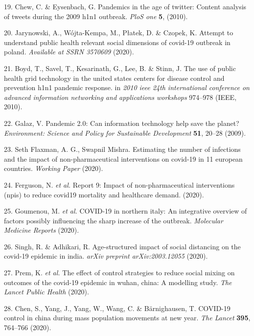 \documentclass[]{article}
\begin{document}
\begin{cslreferences}
\leavevmode\hypertarget{ref-chew2010pandemics}{}%
19. Chew, C. \& Eysenbach, G. Pandemics in the age of twitter: Content analysis of tweets during the 2009 h1n1 outbreak. \emph{PloS one} \textbf{5}, (2010).

\leavevmode\hypertarget{ref-jarynowski2020attempt}{}%
20. Jarynowski, A., Wójta-Kempa, M., Płatek, D. \& Czopek, K. Attempt to understand public health relevant social dimensions of covid-19 outbreak in poland. \emph{Available at SSRN 3570609} (2020).

\leavevmode\hypertarget{ref-boyd2010use}{}%
21. Boyd, T., Savel, T., Kesarinath, G., Lee, B. \& Stinn, J. The use of public health grid technology in the united states centers for disease control and prevention h1n1 pandemic response. in \emph{2010 ieee 24th international conference on advanced information networking and applications workshops} 974--978 (IEEE, 2010).

\leavevmode\hypertarget{ref-galaz2009pandemic}{}%
22. Galaz, V. Pandemic 2.0: Can information technology help save the planet? \emph{Environment: Science and Policy for Sustainable Development} \textbf{51}, 20--28 (2009).

\leavevmode\hypertarget{ref-flaxman2020}{}%
23. Seth Flaxman, A. G., Swapnil Mishra. Estimating the number of infections and the impact of non-pharmaceutical interventions on covid-19 in 11 european countries. \emph{Working Paper} (2020).

\leavevmode\hypertarget{ref-ferguson2020report}{}%
24. Ferguson, N. \emph{et al.} Report 9: Impact of non-pharmaceutical interventions (npis) to reduce covid19 mortality and healthcare demand. (2020).

\leavevmode\hypertarget{ref-goumenou2020covid}{}%
25. Goumenou, M. \emph{et al.} COVID-19 in northern italy: An integrative overview of factors possibly influencing the sharp increase of the outbreak. \emph{Molecular Medicine Reports} (2020).

\leavevmode\hypertarget{ref-singh2020age}{}%
26. Singh, R. \& Adhikari, R. Age-structured impact of social distancing on the covid-19 epidemic in india. \emph{arXiv preprint arXiv:2003.12055} (2020).

\leavevmode\hypertarget{ref-prem2020effect}{}%
27. Prem, K. \emph{et al.} The effect of control strategies to reduce social mixing on outcomes of the covid-19 epidemic in wuhan, china: A modelling study. \emph{The Lancet Public Health} (2020).

\leavevmode\hypertarget{ref-chen2020covid}{}%
28. Chen, S., Yang, J., Yang, W., Wang, C. \& Bärnighausen, T. COVID-19 control in china during mass population movements at new year. \emph{The Lancet} \textbf{395}, 764--766 (2020).


\end{cslreferences}
\end{document}
